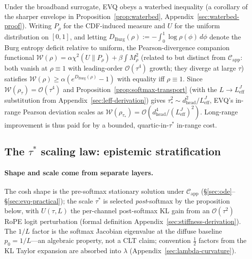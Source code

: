 Under the broadband surrogate, EVQ obeys a waterbed inequality (a corollary of the sharper envelope in Proposition~\ref{prop:waterbed}, Appendix~\ref{sec:waterbed-proof}). Writing $P_\rho$ for the CDF-induced measure and $U$ for the uniform distribution on $[0,1]$, and letting $D_{\mathrm{Burg}}(\rho){:=}{-}\!\int_0^1\!\log\rho(\phi)\,d\phi$ denote the Burg entropy deficit relative to uniform, the Pearson-divergence companion functional $\mathcal{W}(\rho) = \alpha\chi^2(U\|P_\rho) + \beta\!\int M_\rho^2$ (related to but distinct from $\mathcal{C}_{\mathrm{app}}$: both vanish at $\rho{\equiv}1$ with leading-order $\mathcal{O}(\tau^4)$ growth; they diverge at large $\tau$) satisfies $\mathcal{W}(\rho) \ge \alpha(e^{D_{\mathrm{Burg}}(\rho)} - 1)$ with equality iff $\rho\equiv 1$. Since $\mathcal{W}(\rho_\tau){=}\mathcal{O}(\tau^4)$ and Proposition~\ref{prop:softmax-transport} (with the $L\!\to\!L_{\mathrm{eff}}^{J}$ substitution from Appendix~\ref{sec:leff-derivation}) gives $\tau_*^2{\sim}d_{\mathrm{head}}^2/L_{\mathrm{eff}}^{J}$, EVQ's in-range Pearson deviation scales as $\mathcal{W}(\rho_{\tau_*}) = \mathcal{O}(d_{\mathrm{head}}^4/(L_{\mathrm{eff}}^{J})^2)$. Long-range improvement is thus paid for by a bounded, quartic-in-$\tau^*$ in-range cost.

\subsection{The \texorpdfstring{$\tau^*$}{tau*} scaling law: epistemic stratification}
\label{sec:tau-star}

\paragraph{Shape and scale come from separate layers.} The cosh shape is the pre-softmax stationary solution under $\mathcal{C}_{\mathrm{app}}$ (\S\ref{sec:ode}--\S\ref{sec:evq-practical}); the scale $\tau^*$ is selected \emph{post}-softmax by the proposition below, with $U(\tau,L)$ the per-channel post-softmax KL gain from an $\mathcal{O}(\tau^2)$ RoPE logit perturbation (formal definition Appendix~\ref{sec:stiffness-derivation}). The $1/L$ factor is the softmax Jacobian eigenvalue at the diffuse baseline $p_0{=}1/L$---an algebraic property, not a CLT claim; convention $\tfrac{1}{2}$ factors from the KL Taylor expansion are absorbed into $\lambda$ (Appendix~\ref{sec:lambda-curvature}).

